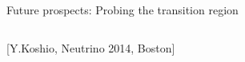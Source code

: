 \begin{frame}[t]{Future prospects: Probing the transition region}
\begin{columns}
\begin{column}{0.56\textwidth}
      {\scriptsize \color{blue}[Y.Koshio, Neutrino 2014, Boston]}
  \end{column}
\end{columns}
\begin{center}
\end{center}
\end{frame}




%
%


%
%

%

%

